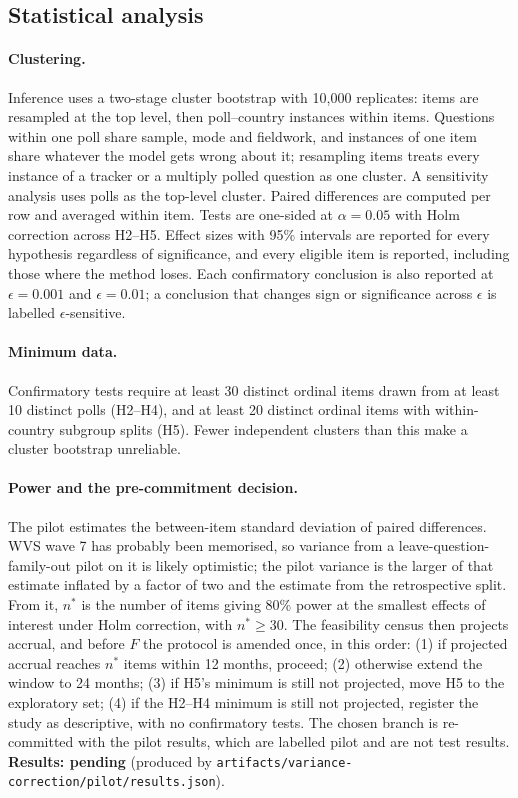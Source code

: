 \documentclass[11pt]{article}
\newcommand{\pending}[1]{\textbf{Results: pending} (produced by \nolinkurl{#1}).}
\begin{document}
\subsection{Statistical analysis}
\label{sec:analysis}
\paragraph{Clustering.} Inference uses a two-stage cluster bootstrap with 10{,}000 replicates: items are resampled at the top level, then poll--country instances within items. Questions within one poll share sample, mode and fieldwork, and instances of one item share whatever the model gets wrong about it; resampling items treats every instance of a tracker or a multiply polled question as one cluster. A sensitivity analysis uses polls as the top-level cluster. Paired differences are computed per row and averaged within item. Tests are one-sided at $\alpha=0.05$ with Holm correction across H2--H5. Effect sizes with 95\% intervals are reported for every hypothesis regardless of significance, and every eligible item is reported, including those where the method loses. Each confirmatory conclusion is also reported at $\epsilon=0.001$ and $\epsilon=0.01$; a conclusion that changes sign or significance across $\epsilon$ is labelled $\epsilon$-sensitive.

\paragraph{Minimum data.} Confirmatory tests require at least 30 distinct ordinal items drawn from at least 10 distinct polls (H2--H4), and at least 20 distinct ordinal items with within-country subgroup splits (H5). Fewer independent clusters than this make a cluster bootstrap unreliable.

\paragraph{Power and the pre-commitment decision.} The pilot estimates the between-item standard deviation of paired differences. WVS wave 7 has probably been memorised, so variance from a leave-question-family-out pilot on it is likely optimistic; the pilot variance is the larger of that estimate inflated by a factor of two and the estimate from the retrospective split. From it, $n^\ast$ is the number of items giving 80\% power at the smallest effects of interest under Holm correction, with $n^\ast\ge30$. The feasibility census then projects accrual, and before $F$ the protocol is amended once, in this order: (1) if projected accrual reaches $n^\ast$ items within 12 months, proceed; (2) otherwise extend the window to 24 months; (3) if H5's minimum is still not projected, move H5 to the exploratory set; (4) if the H2--H4 minimum is still not projected, register the study as descriptive, with no confirmatory tests. The chosen branch is re-committed with the pilot results, which are labelled pilot and are not test results. \pending{artifacts/variance-correction/pilot/results.json}
\end{document}
